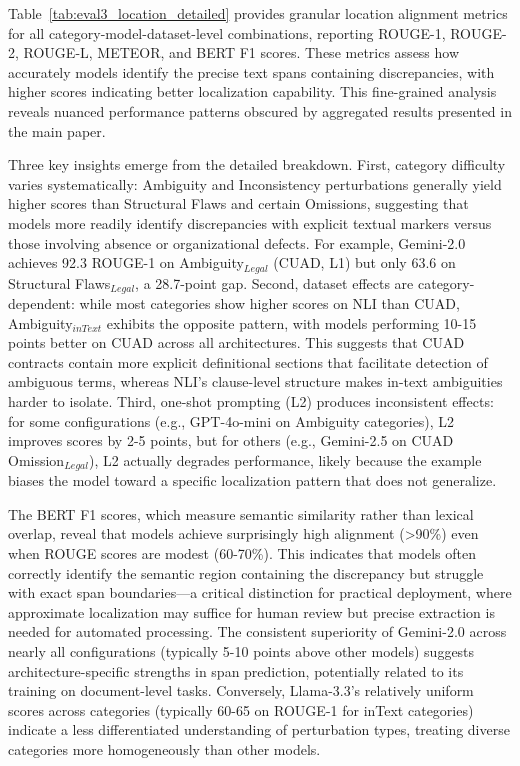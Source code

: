 \documentclass[11pt]{article}
\begin{document}
Table~\ref{tab:eval3_location_detailed} provides granular location alignment metrics for all category-model-dataset-level combinations, reporting ROUGE-1, ROUGE-2, ROUGE-L, METEOR, and BERT F1 scores. These metrics assess how accurately models identify the precise text spans containing discrepancies, with higher scores indicating better localization capability. This fine-grained analysis reveals nuanced performance patterns obscured by aggregated results presented in the main paper.

Three key insights emerge from the detailed breakdown. First, category difficulty varies systematically: Ambiguity and Inconsistency perturbations generally yield higher scores than Structural Flaws and certain Omissions, suggesting that models more readily identify discrepancies with explicit textual markers versus those involving absence or organizational defects. For example, Gemini-2.0 achieves 92.3 ROUGE-1 on Ambiguity$_{Legal}$ (CUAD, L1) but only 63.6 on Structural Flaws$_{Legal}$, a 28.7-point gap. Second, dataset effects are category-dependent: while most categories show higher scores on NLI than CUAD, Ambiguity$_{inText}$ exhibits the opposite pattern, with models performing 10-15 points better on CUAD across all architectures. This suggests that CUAD contracts contain more explicit definitional sections that facilitate detection of ambiguous terms, whereas NLI's clause-level structure makes in-text ambiguities harder to isolate. Third, one-shot prompting (L2) produces inconsistent effects: for some configurations (e.g., GPT-4o-mini on Ambiguity categories), L2 improves scores by 2-5 points, but for others (e.g., Gemini-2.5 on CUAD Omission$_{Legal}$), L2 actually degrades performance, likely because the example biases the model toward a specific localization pattern that does not generalize.

The BERT F1 scores, which measure semantic similarity rather than lexical overlap, reveal that models achieve surprisingly high alignment (>90\%) even when ROUGE scores are modest (60-70\%). This indicates that models often correctly identify the semantic region containing the discrepancy but struggle with exact span boundaries—a critical distinction for practical deployment, where approximate localization may suffice for human review but precise extraction is needed for automated processing. The consistent superiority of Gemini-2.0 across nearly all configurations (typically 5-10 points above other models) suggests architecture-specific strengths in span prediction, potentially related to its training on document-level tasks. Conversely, Llama-3.3's relatively uniform scores across categories (typically 60-65 on ROUGE-1 for inText categories) indicate a less differentiated understanding of perturbation types, treating diverse categories more homogeneously than other models.
\end{document}
